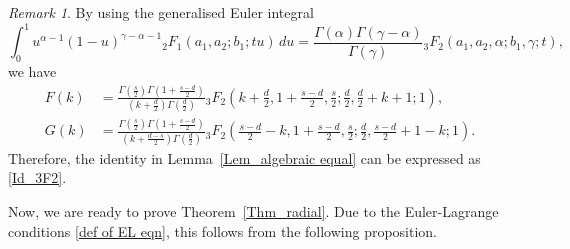 \documentclass[10pt]{amsart}
\theoremstyle{plain}
\theoremstyle{remark}
\newtheorem{rem}{Remark}
\numberwithin{equation}{section}
\begin{document}
\begin{rem}
By using the generalised Euler integral \cite[Eq.(16.5.2)]{NIST}
\begin{equation}
\int_0^1 u^{\alpha-1} (1-u)^{ \gamma-\alpha-1 } {}_2F_1(a_1,a_2;b_1;tu)\,du= \frac{ \Gamma(\alpha)\Gamma(\gamma-\alpha) }{ \Gamma(\gamma) } {}_3F_2( a_1,a_2,\alpha; b_1,\gamma;t), 
\end{equation}
we have 
\begin{align*}
F(k) &= \frac{ \Gamma(\frac{s}{2})\Gamma(1+\frac{s-d}{2}) }{ (k+\frac{d}{2}) \Gamma(\frac{d}{2}) }  {}_3F_2(  k+\tfrac{d}{2}, 1+\tfrac{s-d}{2}, \tfrac{s}{2};  \tfrac{d}{2}, \tfrac{d}{2}+k+1; 1  ),
\\
G(k)&= \frac{ \Gamma(\frac{s}{2})\Gamma(1+\frac{s-d}{2}) }{ (k+\frac{d-s}{2}) \Gamma(\frac{d}{2}) }  {}_3F_2(  \tfrac{s-d}{2}-k, 1+\tfrac{s-d}{2}, \tfrac{s}{2};  \tfrac{d}{2}, \tfrac{s-d}{2}+1-k; 1  ). 
\end{align*}
Therefore, the identity in Lemma~\ref{Lem_algebraic equal} can be expressed as \eqref{Id_3F2}.  
\end{rem}





Now, we are ready to prove Theorem~\ref{Thm_radial}. Due to the Euler-Lagrange conditions \eqref{def of EL eqn}, this follows from the following proposition. 
\end{document}
